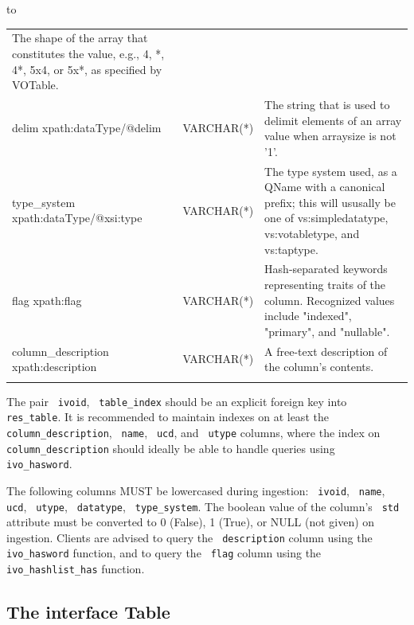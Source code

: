 \documentclass[11pt,a4paper]{ivoa}
\newcommand{\rtent}[1]{\texttt{\color{rtcolor} #1}}
\newenvironment{inlinetable}{\vfil\penalty8000\vfilneg%
    \hbox to\hsize\bgroup\hss}
  {\hss\egroup\vspace{8pt}}
\begin{document}
\begin{inlinetable}
\begin{tabular}{p{}p{}p{}}
The shape of the array that constitutes the value, e.g., 4, *, 4*, 5x4, or 5x*, as specified by VOTable.\\
delim\hfil\break
\scriptsize\ttfamily xpath:dataType/@delim&
\footnotesize VARCHAR(*)&
The string that is used to delimit elements of an array value when arraysize is not '1'.\\
type\_system\hfil\break
\scriptsize\ttfamily xpath:dataType/@xsi:type&
\footnotesize VARCHAR(*)&
The type system used, as a QName with a canonical prefix; this will ususally be one of vs:simpledatatype, vs:votabletype, and vs:taptype.\\
flag\hfil\break
\scriptsize\ttfamily xpath:flag&
\footnotesize VARCHAR(*)&
Hash-separated keywords representing traits of the column. Recognized values include "indexed", "primary", and "nullable".\\
column\_description\hfil\break
\scriptsize\ttfamily xpath:description&
\footnotesize VARCHAR(*)&
A free-text description of the column's contents.\\

\noalign{\vspace{2pt}}
\hline
\end{tabular}
\end{inlinetable}



 

The pair \rtent{ivoid}, \rtent{table\_index} should be an
explicit foreign key into \rtent{res\_table}.  It is recommended to
maintain indexes on at least the \rtent{column\_description},
\rtent{name}, \rtent{ucd}, and \rtent{utype} columns,
where the index on \rtent{column\_description} should ideally be able
to handle queries using \rtent{ivo\_hasword}.

The following columns MUST be lowercased during ingestion:
\rtent{ivoid}, \rtent{name}, \rtent{ucd},
\rtent{utype}, \rtent{datatype}, \rtent{type\_system}.
The boolean value of the column's \rtent{std} attribute must be
converted to 0 (False), 1 (True), or NULL (not given) on ingestion.
Clients are advised to query the \rtent{description}
column using the \rtent{ivo\_hasword} function, and to query
the \rtent{flag} column using the \rtent{ivo\_hashlist\_has}
function.




\subsection{The interface Table}
\end{document}
